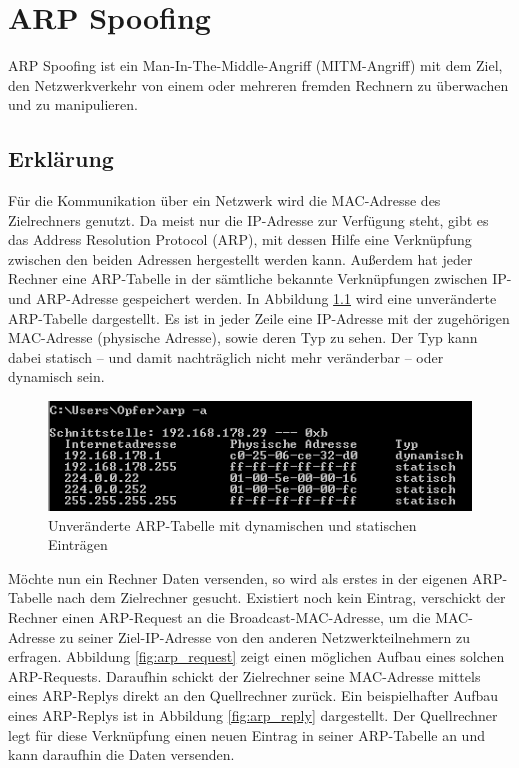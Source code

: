 \chapter{ARP Spoofing}
\label{chapter_arp_spoofing}
ARP Spoofing ist ein Man-In-The-Middle-Angriff (MITM-Angriff) mit dem Ziel, den Netzwerkverkehr von einem oder mehreren fremden Rechnern zu überwachen und zu manipulieren.

\section{Erklärung}
Für die Kommunikation über ein Netzwerk wird die MAC-Adresse des Zielrechners genutzt. Da meist nur die IP-Adresse zur Verfügung steht, gibt es das Address Resolution Protocol (ARP), mit dessen Hilfe eine Verknüpfung zwischen den beiden Adressen hergestellt werden kann. Außerdem hat jeder Rechner eine ARP-Tabelle in der sämtliche bekannte Verknüpfungen zwischen IP- und ARP-Adresse gespeichert werden. In Abbildung \ref{fig:arp_tabelle_vorher} wird eine unveränderte ARP-Tabelle dargestellt. Es ist in jeder Zeile eine IP-Adresse mit der zugehörigen MAC-Adresse (physische Adresse), sowie deren Typ zu sehen. Der Typ kann dabei statisch -- und damit nachträglich nicht mehr veränderbar -- oder dynamisch sein.

\begin{figure}
	\centering
	\includegraphics[width=\textwidth]{images/ARP_Spoofing/ARP_Tabelle_Vorher}
	\caption{Unveränderte ARP-Tabelle mit dynamischen und statischen Einträgen}
	\label{fig:arp_tabelle_vorher}
\end{figure}

Möchte nun ein Rechner Daten versenden, so wird als erstes in der eigenen ARP-Tabelle nach dem Zielrechner gesucht. Existiert noch kein Eintrag, verschickt der Rechner einen ARP-Request an die Broadcast-MAC-Adresse, um die MAC-Adresse zu seiner Ziel-IP-Adresse von den anderen Netzwerkteilnehmern zu erfragen. Abbildung \ref{fig:arp_request} zeigt einen möglichen Aufbau eines solchen ARP-Requests. Daraufhin schickt der Zielrechner seine MAC-Adresse mittels eines ARP-Replys direkt an den Quellrechner zurück. Ein beispielhafter Aufbau eines ARP-Replys ist in Abbildung \ref{fig:arp_reply} dargestellt. Der Quellrechner legt für diese Verknüpfung einen neuen Eintrag in seiner ARP-Tabelle an und kann daraufhin die Daten versenden.

